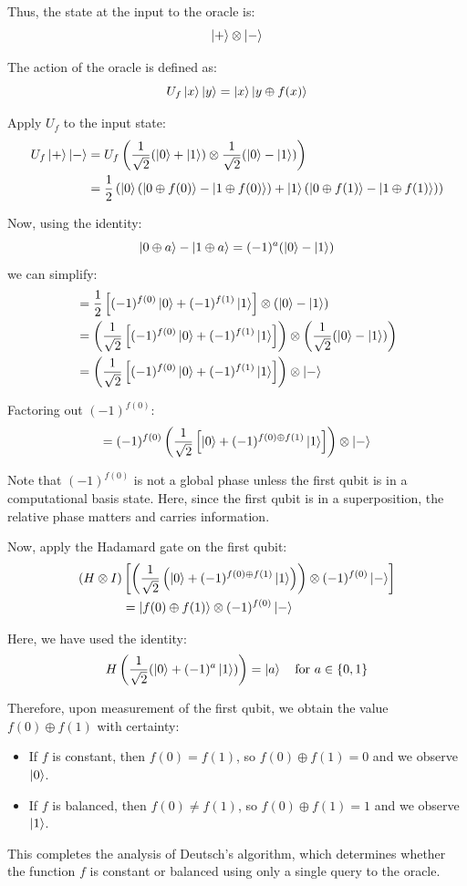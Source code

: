 Thus, the state at the input to the oracle is:
\[
\ket{+} \otimes \ket{-}
\]

The action of the oracle is defined as:
\[
U_f \ket{x} \ket{y} = \ket{x} \ket{y \oplus f(x)}
\]

Apply $U_f$ to the input state:
\begin{align*}
U_f \ket{+} \ket{-} &= U_f \left( \frac{1}{\sqrt{2}}(\ket{0} + \ket{1}) \otimes \frac{1}{\sqrt{2}}(\ket{0} - \ket{1}) \right) \\
&= \frac{1}{2} \left( \ket{0}(\ket{0 \oplus f(0)} - \ket{1 \oplus f(0)}) + \ket{1}(\ket{0 \oplus f(1)} - \ket{1 \oplus f(1)}) \right)
\end{align*}

Now, using the identity:
\[
\ket{0 \oplus a} - \ket{1 \oplus a} = (-1)^a (\ket{0} - \ket{1})
\]
we can simplify:
\begin{align*}
&= \frac{1}{2} \left[ (-1)^{f(0)}\ket{0} + (-1)^{f(1)}\ket{1} \right] \otimes (\ket{0} - \ket{1}) \\
&= \left( \frac{1}{\sqrt{2}} \left[ (-1)^{f(0)} \ket{0} + (-1)^{f(1)} \ket{1} \right] \right) \otimes \left( \frac{1}{\sqrt{2}} (\ket{0} - \ket{1}) \right) \\
&= \left( \frac{1}{\sqrt{2}} \left[ (-1)^{f(0)} \ket{0} + (-1)^{f(1)} \ket{1} \right] \right) \otimes \ket{-}
\end{align*}

Factoring out $(-1)^{f(0)}$:
\[
= (-1)^{f(0)} \left( \frac{1}{\sqrt{2}} \left[ \ket{0} + (-1)^{f(0) \oplus f(1)} \ket{1} \right] \right) \otimes \ket{-}
\]

Note that $(-1)^{f(0)}$ is not a global phase unless the first qubit is in a computational basis state. Here, since the first qubit is in a superposition, the relative phase matters and carries information.

Now, apply the Hadamard gate on the first qubit:
\begin{align*}
(H \otimes I) & \left[ \left( \frac{1}{\sqrt{2}} \left( \ket{0} + (-1)^{f(0) \oplus f(1)} \ket{1} \right) \right) \otimes (-1)^{f(0)} \ket{-} \right] \\
&= \ket{f(0) \oplus f(1)} \otimes (-1)^{f(0)} \ket{-}
\end{align*}

Here, we have used the identity:
\[
H \left( \frac{1}{\sqrt{2}} (\ket{0} + (-1)^a \ket{1}) \right) = \ket{a}
\quad \text{for } a \in \{0,1\}
\]

Therefore, upon measurement of the first qubit, we obtain the value $f(0) \oplus f(1)$ with certainty:
\begin{itemize}
    \item If $f$ is constant, then $f(0) = f(1)$, so $f(0) \oplus f(1) = 0$ and we observe $\ket{0}$.
    \item If $f$ is balanced, then $f(0) \neq f(1)$, so $f(0) \oplus f(1) = 1$ and we observe $\ket{1}$.
\end{itemize}
This completes the analysis of Deutsch’s algorithm, which determines whether the function $f$ is constant or balanced using only a single query to the oracle.

